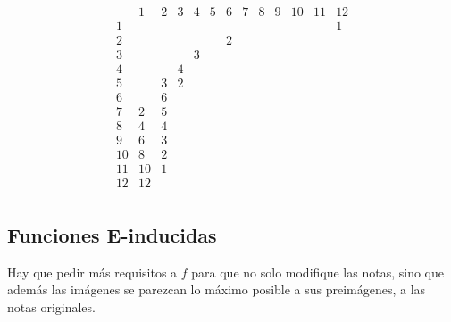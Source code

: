 		\[\begin{array}{l|rrrrrrrrrrrr}
		&1&2&3&4&5&6&7&8&9&10&11&12\\\hline
		1&&&&&&&&&&&&1\\\hline
		2&&&&&&2\\\hline
		3&&&&3\\\hline
		4&&&4\\\hline
		5&&3&2\\\hline
		6&&6\\\hline
		7&2&5\\\hline
		8&4&4\\\hline
		9&6&3\\\hline
		10&8&2\\\hline
		11&10&1\\\hline
		12&12&\\
		\end{array}\]
		
		
	\subsection{Funciones E-inducidas}
		
		Hay que pedir más requisitos a $f$ para que no solo modifique las notas, sino que además las imágenes se parezcan lo máximo posible a sus preimágenes, a las notas originales.
		

